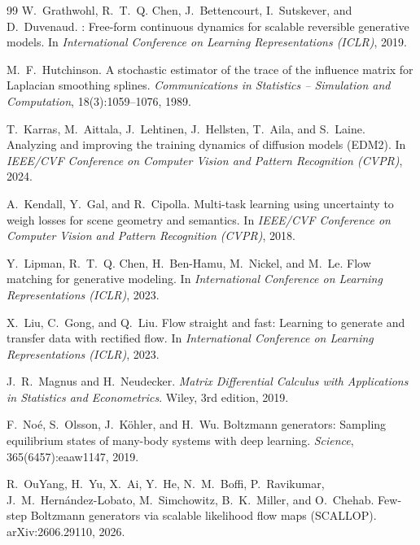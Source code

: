 \documentclass[11pt,a4paper]{article}
\numberwithin{equation}{section}     %
\theoremstyle{plain}        %
\theoremstyle{definition}   %
\theoremstyle{remark}       %
\begin{document}
\begin{thebibliography}{99}
W.~Grathwohl, R.~T.~Q. Chen, J.~Bettencourt, I.~Sutskever, and D.~Duvenaud.
: Free-form continuous dynamics for scalable reversible generative models.
\newblock In \emph{International Conference on Learning Representations (ICLR)}, 2019.

M.~F.~Hutchinson.
\newblock A stochastic estimator of the trace of the influence matrix for {L}aplacian smoothing splines.
\newblock \emph{Communications in Statistics -- Simulation and Computation}, 18(3):1059--1076, 1989.

T.~Karras, M.~Aittala, J.~Lehtinen, J.~Hellsten, T.~Aila, and S.~Laine.
\newblock Analyzing and improving the training dynamics of diffusion models (EDM2).
\newblock In \emph{IEEE/CVF Conference on Computer Vision and Pattern Recognition (CVPR)}, 2024.

A.~Kendall, Y.~Gal, and R.~Cipolla.
\newblock Multi-task learning using uncertainty to weigh losses for scene geometry and semantics.
\newblock In \emph{IEEE/CVF Conference on Computer Vision and Pattern Recognition (CVPR)}, 2018.

Y.~Lipman, R.~T.~Q. Chen, H.~Ben-Hamu, M.~Nickel, and M.~Le.
\newblock Flow matching for generative modeling.
\newblock In \emph{International Conference on Learning Representations (ICLR)}, 2023.

X.~Liu, C.~Gong, and Q.~Liu.
\newblock Flow straight and fast: Learning to generate and transfer data with rectified flow.
\newblock In \emph{International Conference on Learning Representations (ICLR)}, 2023.

J.~R.~Magnus and H.~Neudecker.
\newblock \emph{Matrix Differential Calculus with Applications in Statistics and Econometrics}.
\newblock Wiley, 3rd edition, 2019.

F.~No\'e, S.~Olsson, J.~K\"ohler, and H.~Wu.
\newblock Boltzmann generators: Sampling equilibrium states of many-body systems with deep learning.
\newblock \emph{Science}, 365(6457):eaaw1147, 2019.

R.~OuYang, H.~Yu, X.~Ai, Y.~He, N.~M.~Boffi, P.~Ravikumar, J.~M.~Hern\'andez-Lobato, M.~Simchowitz, B.~K.~Miller, and O.~Chehab.
\newblock Few-step {B}oltzmann generators via scalable likelihood flow maps (SCALLOP).
\newblock arXiv:2606.29110, 2026.


\end{thebibliography}
\end{document}
